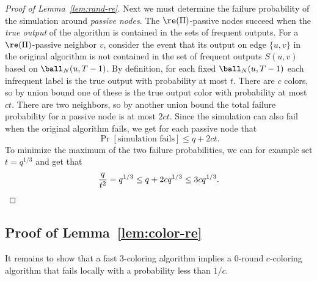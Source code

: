 \begin{proof}[Proof of Lemma~\ref{lem:rand-re}]
Next we must determine the failure probability of the simulation around \emph{passive nodes}. The $\re(\Pi)$-passive nodes succeed when the \emph{true output} of the algorithm is contained in the sets of frequent outputs. For a $\re(\Pi)$-passive neighbor $v$, consider the event that its output on edge $\{u,v\}$ in the original algorithm is not contained in the set of frequent outputs $S(u,v)$ based on $\ball_N(u,T-1)$. By definition, for each fixed $\ball_N(u,T-1)$ each infrequent label is the true output with probability at most $t$. There are $c$ colors, so by union bound one of these is the true output color with probability at most $ct$. There are two neighbors, so by another union bound the total failure probability for a passive node is at most $2ct$. Since the simulation can also fail when the original algorithm fails, we get for each passive node that
\[
	\Pr[\text{simulation fails}] \leq q + 2ct.
\]
To minimize the maximum of the two failure probabilities, we can for example set $t = q^{1/3}$ and get that
\[
	\frac{q}{t^2} = q^{1/3} \leq q + 2cq^{1/3} \leq 3cq^{1/3}. \qedhere
\]
\end{proof}

\subsection{Proof of Lemma~\ref{lem:color-re}} \label{ssec:prob-re}

It remains to show that a fast 3-coloring algorithm implies a 0-round $c$-coloring algorithm that fails locally with a probability less than $1/c$.

